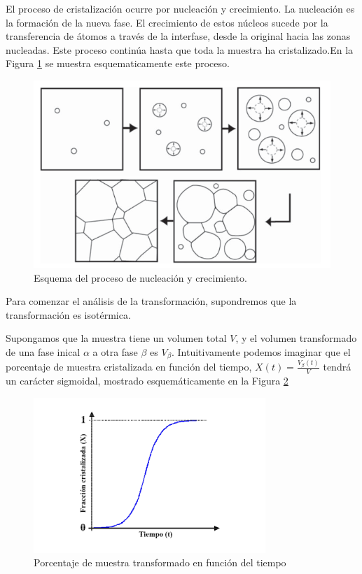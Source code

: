 \documentclass{article}
\theoremstyle{definition}
\theoremstyle{remark}
\begin{document}
 El proceso de cristalización ocurre por nucleación y crecimiento. La nucleación es la formación de la nueva fase. El crecimiento de estos núcleos sucede por la transferencia de átomos a través de la interfase, desde la original hacia las zonas nucleadas. Este proceso continúa hasta que toda la muestra ha cristalizado.En la Figura \ref{cristalization} se muestra esquematicamente este proceso.
 \begin{figure}[H]
 	\centering
	\includegraphics[scale=0.5]{img/cristalization.png}
 	\caption{Esquema del proceso de nucleación y crecimiento.}
	\label{cristalization}
\end{figure} 

Para comenzar el análisis de la transformación, supondremos que la transformación es isotérmica.

Supongamos que la muestra tiene un volumen total $V$, y el volumen transformado de una fase inical $\alpha$ a otra fase $\beta$ es $V_\beta$. Intuitivamente podemos imaginar que el porcentaje de muestra cristalizada en función del tiempo, $X(t) = \frac{V_\beta (t)}{V}$ tendrá un carácter sigmoidal, mostrado esquemáticamente en la Figura \ref{cvst}

 \begin{figure}[H]
 	\centering
	\includegraphics[scale=0.5]{img/cristalization_vs_tiempo.png}
 	\caption{Porcentaje de muestra transformado en función del tiempo}
	\label{cvst}
\end{figure} 
\end{document}
